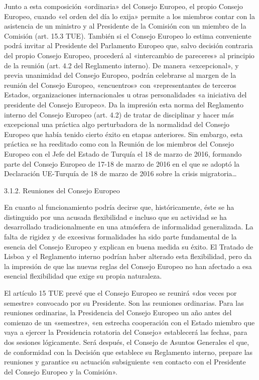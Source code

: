 \documentclass[10pt,a4paper]{article}
\begin{document}
Junto a esta composición «ordinaria» del Consejo Europeo, el propio Consejo Europeo, cuando «el orden del día lo exija» permite a los miembros contar con la asistencia de un ministro y al Presidente de la Comisión con un miembro de la Comisión (art. 15.3 TUE). También si el Consejo Europeo lo estima conveniente podrá invitar al Presidente del Parlamento Europeo que, salvo decisión  contraria del propio Consejo Europeo, procederá al «intercambio de pareceres» al principio de la reunión (art. 4.2 del Reglamento interno). De manera «excepcional», y previa unanimidad del Consejo Europeo, podrán celebrarse al margen de la reunión del Consejo Europeo, «encuentros» con «representantes de terceros Estados, organizaciones internacionales u otras personalidades «a iniciativa del presidente del Consejo Europeo». Da la impresión esta norma del Reglamento interno del Consejo Europeo (art. 4.2) de tratar de disciplinar y hacer más excepcional una práctica algo perturbadora de la normalidad del Consejo Europeo que había tenido cierto éxito en etapas anteriores. Sin embargo, esta práctica se ha reeditado como con la Reunión de los miembros del Consejo Europeo con el Jefe del Estado de Turquía el 18 de marzo de 2016, formando parte del Consejo Europeo de 17-18 de marzo de 2016 en el que se adoptó la Declaración UE-Turquía de 18 de marzo de 2016 sobre la crisis migratoria…

3.1.2. Reuniones del Consejo Europeo

En cuanto al funcionamiento podría decirse que, históricamente, éste se ha distinguido por una acusada flexibilidad e incluso que su actividad se ha desarrollado tradicionalmente en una atmósfera de informalidad generalizada. La falta de rigidez y de excesivas formalidades ha sido parte fundamental de la esencia del Consejo Europeo y explican en buena medida su éxito. El Tratado de Lisboa y el Reglamento interno podrían haber alterado esta flexibilidad, pero da la impresión de que las nuevas reglas del Consejo Europeo no han afectado a esa esencial flexibilidad que exige su propia naturaleza.

El artículo 15 TUE prevé que el Consejo Europeo se reunirá «dos veces por semestre» convocado por su Presidente. Son las reuniones ordinarias. Para las reuniones ordinarias, la Presidencia del Consejo Europeo un año antes del comienzo de un «semestre», «en estrecha cooperación con el Estado miembro que vaya a ejercer la Presidencia rotatoria del Consejo» establecerá las fechas, para dos sesiones lógicamente. Será después, el Consejo de Asuntos Generales el que, de conformidad con la Decisión que establece su Reglamento interno, prepare las reuniones y garantice su actuación subsiguiente «en contacto con el Presidente del Consejo Europeo y la Comisión».
\end{document}
